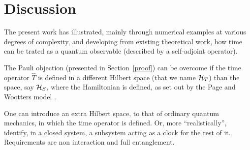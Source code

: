 \section{Discussion}

The present work has illustrated,
mainly through numerical examples
at various degrees of complexity,
and developing from existing theoretical work,
how time can be trated as a quantum observable
(described by a self-adjoint operator).

The Pauli objection (presented in Section~\ref{proof})
can be overcome if the time operator $\hat{T}$
is defined in a different Hilbert space (that we name $\mathcal{H}_T$)
than the space, say $\mathcal{H}_S$, where the Hamiltonian is defined,
as set out by the Page and Wootters model
\parencite{PageWootters, Lloyd:Time, Marletto:Evolution, Maccone:QMOT, Maccone:Pauli}.

One can introduce an extra Hilbert space, to that of ordinary quantum mechanics,
in which the time operator is defined.
Or, more ``realistically'', identify, in a closed system, a subsystem
acting as a clock for the rest of it. Requirements are non interaction and
full entanglement.